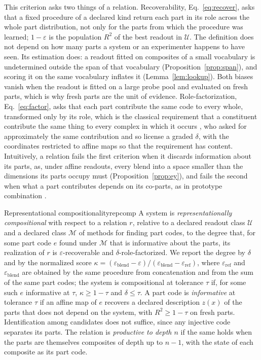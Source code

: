 \documentclass[10pt]{article}
\theoremstyle{plain}
\theoremstyle{remark}
\newcommand{\U}{\mathcal{U}}
\newcommand{\M}{\mathcal{M}}
\begin{document}
This criterion asks two things of a relation. Recoverability, Eq.~\eqref{eq:recover}, asks that a fixed procedure of a declared kind return each part in its role across the whole part distribution, not only for the parts from which the procedure was learned; $1 - \varepsilon$ is the population $R^2$ of the best readout in $\U$. The definition does not depend on how many parts a system or an experimenter happens to have seen. Its estimation does: a readout fitted on composites of a small vocabulary is undetermined outside the span of that vocabulary (Proposition~\ref{prop:span}), and scoring it on the same vocabulary inflates it (Lemma~\ref{lem:lookup}). Both biases vanish when the readout is fitted on a large probe pool and evaluated on fresh parts, which is why fresh parts are the unit of evidence. Role-factorization, Eq.~\eqref{eq:factor}, asks that each part contribute the same code to every whole, transformed only by its role, which is the classical requirement that a constituent contribute the same thing to every complex in which it occurs \citep{fodor1988}, who asked for approximately the same contribution and so license a graded $\delta$, with the coordinates restricted to affine maps so that the requirement has content. Intuitively, a relation fails the first criterion when it discards information about its parts, as, under affine readouts, every blend into a space smaller than the dimensions its parts occupy must (Proposition~\ref{prop:ey}), and fails the second when what a part contributes depends on its co-parts, as in prototype combination \citep{smith1988,hampton1987}.

\begin{defbox}{Representational compositionality}{repcomp}
A system is \emph{representationally compositional} with respect to a relation $r$, relative to a declared readout class $\U$ and a declared class $\M$ of methods for finding part codes, to the degree that, for some part code $e$ found under $\M$ that is informative about the parts, its realization of $r$ is $\varepsilon$-recoverable and $\delta$-role-factorized. We report the degree by $\delta$ and by the normalized score $\kappa = (\varepsilon_{\mathrm{blend}} - \varepsilon)/(\varepsilon_{\mathrm{blend}} - \varepsilon_{\mathrm{ref}})$, where $\varepsilon_{\mathrm{ref}}$ and $\varepsilon_{\mathrm{blend}}$ are obtained by the same procedure from concatenation and from the sum of the same part codes; the system is compositional at tolerance $\tau$ if, for some such $e$ informative at $\tau$, $\kappa \ge 1 - \tau$ and $\delta \le \tau$. A part code is \emph{informative} at tolerance $\tau$ if an affine map of $e$ recovers a declared description $z(x)$ of the parts that does not depend on the system, with $R^2 \ge 1 - \tau$ on fresh parts. Identification among candidates does not suffice, since any injective code separates its parts. The relation is \emph{productive to depth $n$} if the same holds when the parts are themselves composites of depth up to $n - 1$, with the state of each composite as its part code.
\end{defbox}
\end{document}
